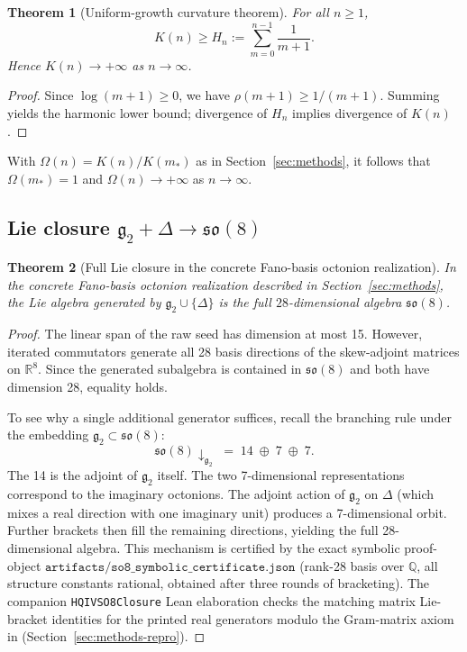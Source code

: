 \documentclass[11pt]{amsart}
\newtheorem{theorem}{Theorem}[section]
\begin{document}
\begin{theorem}[Uniform-growth curvature theorem]
For all \(n\ge1\),
\[
K(n)\ge H_n:=\sum_{m=0}^{n-1}\frac1{m+1}.
\]
Hence \(K(n)\to+\infty\) as \(n\to\infty\).
\end{theorem}

\begin{proof}
Since \(\log(m+1)\ge0\), we have \(\rho(m+1)\ge1/(m+1)\). Summing yields the harmonic lower bound; divergence of \(H_n\) implies divergence of \(K(n)\).
\end{proof}

With \(\Omega(n)=K(n)/K(m_\ast)\) as in Section~\ref{sec:methods}, it follows that \(\Omega(m_\ast)=1\) and \(\Omega(n)\to+\infty\) as \(n\to\infty\).

\subsection{Lie closure \texorpdfstring{$\mathfrak{g}_2+\Delta\to\mathfrak{so}(8)$}{g2 + Delta to so8}}

\begin{theorem}[Full Lie closure in the concrete Fano-basis octonion realization]
In the concrete Fano-basis octonion realization described in Section~\ref{sec:methods}, the Lie algebra generated by \(\mathfrak{g}_2\cup\{\Delta\}\) is the full \(28\)-dimensional algebra \(\mathfrak{so}(8)\).
\end{theorem}

\begin{proof}
The linear span of the raw seed has dimension at most 15. However, iterated commutators generate all 28 basis directions of the skew-adjoint matrices on \(\mathbb{R}^8\). Since the generated subalgebra is contained in \(\mathfrak{so}(8)\) and both have dimension 28, equality holds.

To see why a single additional generator suffices, recall the branching rule under the embedding \(\mathfrak{g}_2\subset\mathfrak{so}(8)\):
\[
\mathfrak{so}(8)\downarrow_{\mathfrak{g}_2}\;=\;14\;\oplus\;7\;\oplus\;7.
\]
The 14 is the adjoint of \(\mathfrak{g}_2\) itself. The two 7-dimensional representations correspond to the imaginary octonions. The adjoint action of \(\mathfrak{g}_2\) on \(\Delta\) (which mixes a real direction with one imaginary unit) produces a 7-dimensional orbit. Further brackets then fill the remaining directions, yielding the full 28-dimensional algebra. This mechanism is certified by the exact symbolic proof-object \(\texttt{artifacts/so8\_symbolic\_certificate.json}\) (rank-28 basis over \(\mathbb{Q}\), all structure constants rational, obtained after three rounds of bracketing). The companion \texttt{HQIVSO8Closure} Lean elaboration checks the matching matrix Lie-bracket identities for the printed real generators modulo the Gram-matrix axiom in  (Section~\ref{sec:methods-repro}).
\end{proof}
\end{document}
